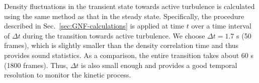 \documentclass[twocolumn,aps,prx,amsmath,amssymb,longbibliography]{revtex4-2}
\begin{document}
Density fluctuations in the transient state towards active turbulence is calculated using the same method as that in the steady state. Specifically, the procedure described in Sec.~\ref{sec:GNF-calculations} is applied at time $t$ over a time interval of $\Delta t$ during the transition towards active turbulence. We choose $\Delta t = 1.7$ s (50 frames), which is slightly smaller than the density correlation time and thus provides sound statistics. As a comparison, the entire transition takes about 60 s (1800 frames). Thus, $\Delta t$ is also small enough and provides a good temporal resolution to monitor the kinetic process.









\end{document}
